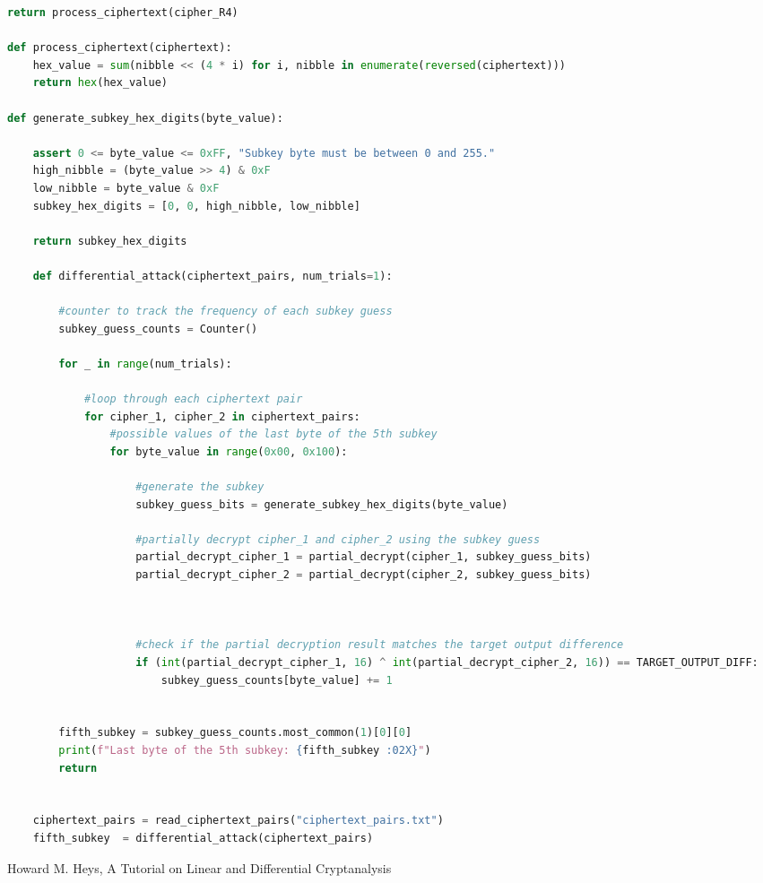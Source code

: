 \documentclass[letterpaper,12pt]{article}
\begin{document}
\begin{lstlisting}[language=Python, caption=Python code subkey retrieval by Danning, label=lts:attD]
        return process_ciphertext(cipher_R4)

def process_ciphertext(ciphertext):
    hex_value = sum(nibble << (4 * i) for i, nibble in enumerate(reversed(ciphertext)))
    return hex(hex_value)

def generate_subkey_hex_digits(byte_value):

    assert 0 <= byte_value <= 0xFF, "Subkey byte must be between 0 and 255."
    high_nibble = (byte_value >> 4) & 0xF  
    low_nibble = byte_value & 0xF        
    subkey_hex_digits = [0, 0, high_nibble, low_nibble]
   
    return subkey_hex_digits

    def differential_attack(ciphertext_pairs, num_trials=1):

        #counter to track the frequency of each subkey guess
        subkey_guess_counts = Counter()

        for _ in range(num_trials):

            #loop through each ciphertext pair
            for cipher_1, cipher_2 in ciphertext_pairs:
                #possible values of the last byte of the 5th subkey
                for byte_value in range(0x00, 0x100):
                
                    #generate the subkey
                    subkey_guess_bits = generate_subkey_hex_digits(byte_value)

                    #partially decrypt cipher_1 and cipher_2 using the subkey guess
                    partial_decrypt_cipher_1 = partial_decrypt(cipher_1, subkey_guess_bits)
                    partial_decrypt_cipher_2 = partial_decrypt(cipher_2, subkey_guess_bits)


                
                    #check if the partial decryption result matches the target output difference
                    if (int(partial_decrypt_cipher_1, 16) ^ int(partial_decrypt_cipher_2, 16)) == TARGET_OUTPUT_DIFF:
                        subkey_guess_counts[byte_value] += 1


        fifth_subkey = subkey_guess_counts.most_common(1)[0][0]
        print(f"Last byte of the 5th subkey: {fifth_subkey :02X}")
        return


    ciphertext_pairs = read_ciphertext_pairs("ciphertext_pairs.txt")
    fifth_subkey  = differential_attack(ciphertext_pairs)
\end{lstlisting}

\begin{thebibliography}{99}
     Howard M. Heys, A Tutorial on Linear and Differential Cryptanalysis
\end{thebibliography}
\end{document}

